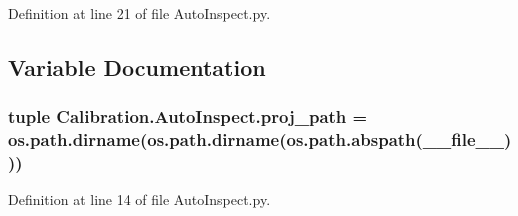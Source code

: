 Definition at line 21 of file Auto\+Inspect.\+py.



\subsection{Variable Documentation}
\hypertarget{namespace_calibration_1_1_auto_inspect_ae376a0832bf96e661ffaed625c443913}{}
\subsubsection[{proj\+\_\+path}]{\setlength{\rightskip}{0pt plus 5cm}tuple Calibration.\+Auto\+Inspect.\+proj\+\_\+path = os.\+path.\+dirname(os.\+path.\+dirname(os.\+path.\+abspath(\+\_\+\+\_\+file\+\_\+\+\_\+)))}\label{namespace_calibration_1_1_auto_inspect_ae376a0832bf96e661ffaed625c443913}


Definition at line 14 of file Auto\+Inspect.\+py.

